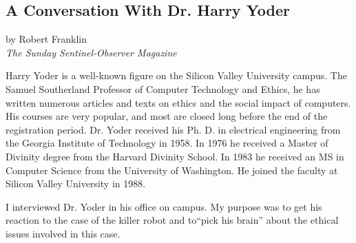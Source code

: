 \begin{center}
\section*{A Conversation With Dr. Harry Yoder}
by Robert Franklin\\
\textit{The Sunday Sentinel-Observer Magazine}
\end{center}

Harry Yoder is a well-known figure on the Silicon Valley University campus. The Samuel Southerland Professor of Computer Technology and Ethics, he has written numerous articles and texts on ethics and the social impact of computers. His courses are very popular, and most are closed long before the end of the registration period. Dr. Yoder received his Ph. D. in electrical engineering from the Georgia Institute of Technology in 1958. In 1976 he received a Master of Divinity degree from the Harvard Divinity School. In 1983 he received an MS in Computer Science from the University of Washington. He joined the faculty at Silicon Valley University in 1988.

I interviewed Dr. Yoder in his office on campus. My purpose was to get his reaction to the case of the killer robot and to``pick his brain'' about the ethical issues involved in this case.
